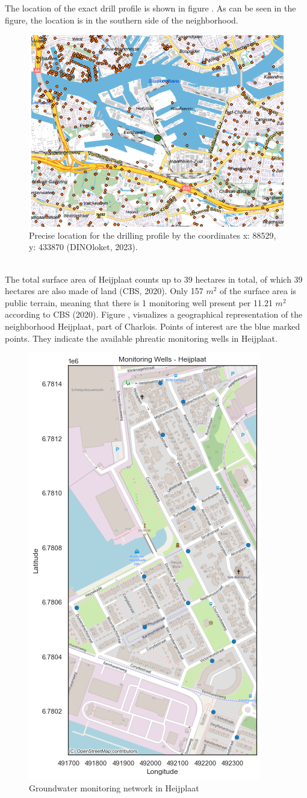 \newpage
The location of the exact drill profile is shown in figure . As can be seen in the figure, the location is in the southern side of the neighborhood.
\begin{figure}[htbp]
    \centering
    \includegraphics[width=0.60\linewidth]{figures/heij/boor.png}
    \caption{Precise location for the drilling profile by the coordinates x: 88529, y: 433870 (DINOloket, 2023).}
    \label{drillheij}
\end{figure}\\

The total surface area of Heijplaat counts up to 39 hectares in total, of which 39 hectares are also made of land (CBS, 2020). Only 157 $m^2$ of the surface area is public terrain, meaning that there is 1 monitoring well present per 11.21 $m^2$ according to CBS (2020). Figure , visualizes a geographical representation of the neighborhood Heijplaat, part of Charlois. Points of interest are the blue marked points. They indicate the available phreatic monitoring wells in Heijplaat. 

\begin{figure}[htbp]
    \centering
    \includegraphics[width=0.60\linewidth]{frontmatter/Heijplaat-fig/Before.png}
    \caption{Groundwater monitoring network in Heijplaat}
    \label{beforeheij}
\end{figure}










